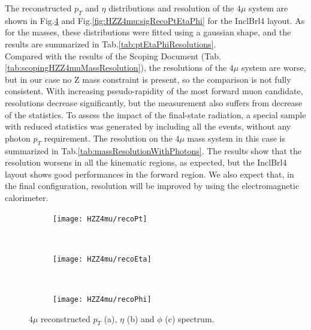 \documentclass[a4paper,twoside,12pt]{book}
\begin{document}
The reconstructed $p_T$ and $\eta$ distributions and resolution of the $4\mu$ system 
are shown in Fig.\ref{fig:HZZ4mu:recoPtEtaPhi} and Fig.\ref{fig:HZZ4mu:sigRecoPtEtaPhi} for the
InclBrl4 layout. As for the masses, these distributions were fitted using a gaussian shape, 
and the results are summarized in Tab.\ref{tab:ptEtaPhiResolutions}. \\

Compared with the results of the Scoping Document (Tab.\ref{tab:scopingHZZ4muMassResolution}), the resolutions
of the $4\mu$ system are worse, but in our case no Z mass constraint is present, so the comparison
is not fully consistent. With increasing pseudo-rapidity of the most forward muon candidate,
resolutions decrease significantly, but the measurement also suffers from 
decrease of the statistics. To assess the impact of the final-state radiation, a special sample
with reduced statistics was generated by including all the events, without 
any photon $p_{T}$ requirement. The resolution on the $4\mu$ mass system in this case is summarized
in Tab.\ref{tab:massResolutionWithPhotons}. The results show that the resolution worsens in all the kinematic regions, as expected, 
but the InclBrl4
layout shows good performances in the forward region. We also expect that, in the
final configuration, resolution will be improved by using the electromagnetic calorimeter.

\begin{figure}
\begin{subfigure}{\linewidth}
\centering
\texttt{[image: HZZ4mu/recoPt]}
\caption{}
\label{fig:HZZ4mu:recoPt}
\end{subfigure}\\[1ex]
\begin{subfigure}{\linewidth}
\centering
\texttt{[image: HZZ4mu/recoEta]}
\caption{}
\label{fig:HZZ4mu:recoEta}
\end{subfigure}\\[1ex]
\begin{subfigure}{\linewidth}
\centering
\texttt{[image: HZZ4mu/recoPhi]}
\caption{}
\label{fig:HZZ4mu:recoPhi}
\end{subfigure}
\caption{$4\mu$ reconstructed $p_{T}$ (a), $\eta$ (b) and $\phi$ (c) spectrum.}
\label{fig:HZZ4mu:recoPtEtaPhi}
\end{figure}
\end{document}
